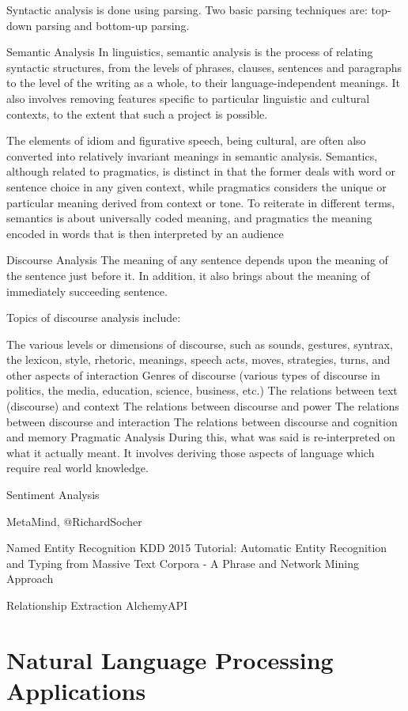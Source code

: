 Syntactic analysis is done using parsing. Two basic parsing techniques are: top-down parsing and bottom-up parsing.

Semantic Analysis
In linguistics, semantic analysis is the process of relating syntactic structures, from the levels of phrases, clauses, sentences and paragraphs to the level of the writing as a whole, to their language-independent meanings. It also involves removing features specific to particular linguistic and cultural contexts, to the extent that such a project is possible.

The elements of idiom and figurative speech, being cultural, are often also converted into relatively invariant meanings in semantic analysis. Semantics, although related to pragmatics, is distinct in that the former deals with word or sentence choice in any given context, while pragmatics considers the unique or particular meaning derived from context or tone. To reiterate in different terms, semantics is about universally coded meaning, and pragmatics the meaning encoded in words that is then interpreted by an audience

Discourse Analysis
The meaning of any sentence depends upon the meaning of the sentence just before it. In addition, it also brings about the meaning of immediately succeeding sentence.

Topics of discourse analysis include:

The various levels or dimensions of discourse, such as sounds, gestures, syntrax, the lexicon, style, rhetoric, meanings, speech acts, moves, strategies, turns, and other aspects of interaction
Genres of discourse (various types of discourse in politics, the media, education, science, business, etc.)
The relations between text (discourse) and context
The relations between discourse and power
The relations between discourse and interaction
The relations between discourse and cognition and memory
Pragmatic Analysis
During this, what was said is re-interpreted on what it actually meant. It involves deriving those aspects of language which require real world knowledge.

Sentiment Analysis

MetaMind, @RichardSocher

Named Entity Recognition
KDD 2015 Tutorial: Automatic Entity Recognition and Typing from Massive Text Corpora - A Phrase and Network Mining Approach

Relationship Extraction
AlchemyAPI

\section{Natural Language Processing Applications}

